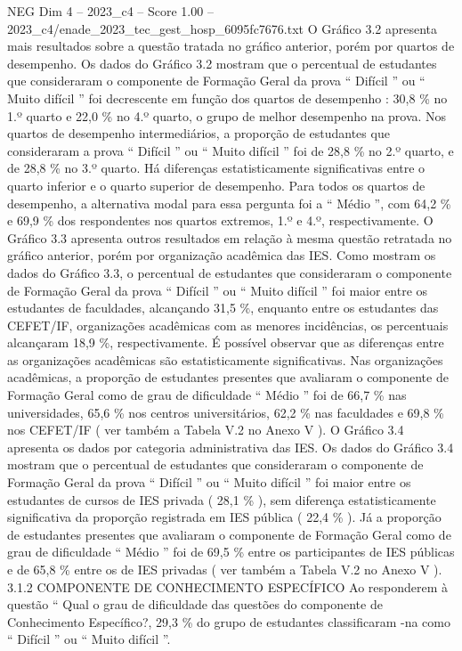 \begin{textsample}{NEG Dim 4 – 2023\_c4 – Score 1.00 – 2023\_c4/enade\_2023\_tec\_gest\_hosp\_6095fc7676.txt}
O Gráfico 3.2 apresenta mais resultados sobre a questão tratada no gráfico anterior, porém por quartos de desempenho.
Os dados do Gráfico 3.2 mostram que o percentual de estudantes que consideraram o componente de Formação Geral da prova “ Difícil ” ou “ Muito difícil ” foi decrescente em função dos quartos de desempenho : 30,8 \% no 1.º quarto e 22,0 \% no 4.º quarto, o grupo de melhor desempenho na prova.
Nos quartos de desempenho intermediários, a proporção de estudantes que consideraram a prova “ Difícil ” ou “ Muito difícil ” foi de 28,8 \% no 2.º quarto, e de 28,8 \% no 3.º quarto.
Há diferenças estatisticamente significativas entre o quarto inferior e o quarto superior de desempenho.
Para todos os quartos de desempenho, a alternativa modal para essa pergunta foi a “ Médio ”, com 64,2 \% e 69,9 \% dos respondentes nos quartos extremos, 1.º e 4.º, respectivamente.
O Gráfico 3.3 apresenta outros resultados em relação à mesma questão retratada no gráfico anterior, porém por organização acadêmica das IES.
Como mostram os dados do Gráfico 3.3, o percentual de estudantes que consideraram o componente de Formação Geral da prova “ Difícil ” ou “ Muito difícil ” foi maior entre os estudantes de faculdades, alcançando 31,5 \%, enquanto entre os estudantes das CEFET/IF, organizações acadêmicas com as menores incidências, os percentuais alcançaram 18,9 \%, respectivamente.
É possível observar que as diferenças entre as organizações acadêmicas são estatisticamente significativas.
Nas organizações acadêmicas, a proporção de estudantes presentes que avaliaram o componente de Formação Geral como de grau de dificuldade “ Médio ” foi de 66,7 \% nas universidades, 65,6 \% nos centros universitários, 62,2 \% nas faculdades e 69,8 \% nos CEFET/IF ( ver também a Tabela V.2 no Anexo V ).
O Gráfico 3.4 apresenta os dados por categoria administrativa das IES.
Os dados do Gráfico 3.4 mostram que o percentual de estudantes que consideraram o componente de Formação Geral da prova “ Difícil ” ou “ Muito difícil ” foi maior entre os estudantes de cursos de IES privada ( 28,1 \% ), sem diferença estatisticamente significativa da proporção registrada em IES pública ( 22,4 \% ).
Já a proporção de estudantes presentes que avaliaram o componente de Formação Geral como de grau de dificuldade “ Médio ” foi de 69,5 \% entre os participantes de IES públicas e de 65,8 \% entre os de IES privadas ( ver também a Tabela V.2 no Anexo V ). 3.1.2 COMPONENTE DE CONHECIMENTO ESPECÍFICO Ao responderem à questão “ Qual o grau de dificuldade das questões do componente de Conhecimento Específico?, 29,3 \% do grupo de estudantes classificaram -na como “ Difícil ” ou “ Muito difícil ”.

\end{textsample}
